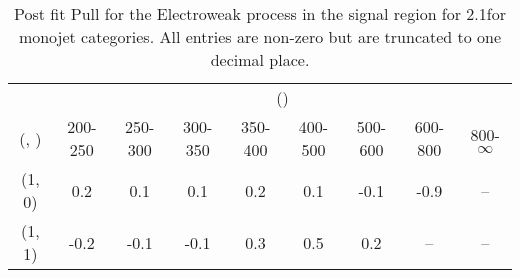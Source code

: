 \begin{table}[h!]
\tiny
\centering
\caption{Post fit Pull for the Electroweak process in the signal region for 2.1\ifb for monojet categories. All entries are non-zero but are truncated to one decimal place.\label{tab:pullseppost_sig_ewk_mono}}
\begin{tabular}
{ccccccccc}
	\hline\hline
	& \multicolumn{8}{c}{\scalht (\gev)} \\ 
	 (\njet,  \nb) & 200-250 & 250-300 & 300-350 & 350-400 & 400-500 & 500-600 & 600-800 & 800-$\infty$ \\ [0.8ex] 
\hline
	(1, 0) & 0.2 & 0.1 & 0.1 & 0.2 & 0.1 & -0.1 & -0.9 & -- \\[0.5ex] 
	(1, 1) & -0.2 & -0.1 & -0.1 & 0.3 & 0.5 & 0.2 & -- & -- \\[0.5ex] 
	\hline
	\hline
\end{tabular}
\end{table}

